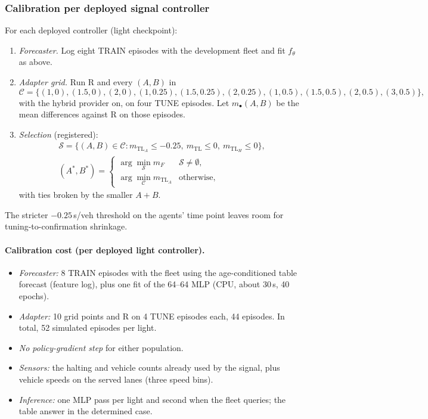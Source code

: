 \documentclass[11pt]{article}
\begin{document}
\subsubsection{Calibration per deployed signal controller}
For each deployed controller (light checkpoint):
\begin{enumerate}\setlength\itemsep{0pt}
\item \emph{Forecaster.} Log eight TRAIN episodes with the development fleet and fit $f_\theta$ as above.
\item \emph{Adapter grid.} Run R and every $(A,B)$ in
\[\mathcal C=\{(1,0),(1.5,0),(2,0),(1,0.25),(1.5,0.25),(2,0.25),(1,0.5),(1.5,0.5),(2,0.5),(3,0.5)\},\]
with the hybrid provider on, on four TUNE episodes. Let $m_\bullet(A,B)$ be the mean differences against R on those episodes.
\item \emph{Selection} (registered):
\begin{gather}
\mathcal S=\{(A,B)\in\mathcal C: m_{\mathrm{TL}_A}\le-0.25,\ m_{\mathrm{TL}}\le0,\ m_{\mathrm{TL}_H}\le0\},\\
(A^*,B^*)=\begin{cases}\arg\min_{\mathcal S} m_{F} & \mathcal S\neq\emptyset,\\ \arg\min_{\mathcal C} m_{\mathrm{TL}_A} & \text{otherwise,}\end{cases}
\end{gather}
with ties broken by the smaller $A+B$.
\end{enumerate}
The stricter $-0.25$\,s/veh threshold on the agents' time point leaves room for tuning-to-confirmation shrinkage.
\paragraph{Calibration cost (per deployed light controller).}
\begin{itemize}\setlength\itemsep{0pt}
\item \emph{Forecaster:} 8 TRAIN episodes with the fleet using the age-conditioned table forecast (feature log), plus one fit of the
64--64 MLP (CPU, about 30\,s, 40 epochs).
\item \emph{Adapter:} 10 grid points and R on 4 TUNE episodes each, 44 episodes. In total, 52 simulated episodes per light.
\item \emph{No policy-gradient step} for either population.
\item \emph{Sensors:} the halting and vehicle counts already used by the signal, plus vehicle speeds on the served lanes (three speed bins).
\item \emph{Inference:} one MLP pass per light and second when the fleet queries; the table answer in the determined case.
\end{itemize}
\end{document}
